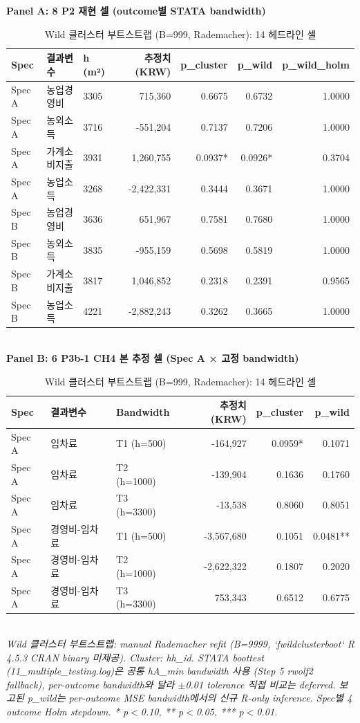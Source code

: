 \begin{table}[t]
\centering
\caption{Wild 클러스터 부트스트랩 (B=999, Rademacher): 14 헤드라인 셀}
\label{tab:wild_bootstrap_ko}
\textbf{Panel A: 8 P2 재현 셀 (outcome별 STATA bandwidth)}\\
\begin{tabular}{lllrrrr}
\toprule
Spec & 결과변수 & h (m²) & 추정치 (KRW) & p\_cluster & p\_wild & p\_wild\_holm \\
\midrule
Spec A & 농업경영비 & 3305 & 715,360 & 0.6675 & 0.6732 & 1.0000 \\
Spec A & 농외소득 & 3716 & -551,204 & 0.7137 & 0.7206 & 1.0000 \\
Spec A & 가계소비지출 & 3931 & 1,260,755 & 0.0937* & 0.0926* & 0.3704 \\
Spec A & 농업소득 & 3268 & -2,422,331 & 0.3444 & 0.3671 & 1.0000 \\
Spec B & 농업경영비 & 3636 & 651,967 & 0.7581 & 0.7680 & 1.0000 \\
Spec B & 농외소득 & 3835 & -955,159 & 0.5698 & 0.5819 & 1.0000 \\
Spec B & 가계소비지출 & 3817 & 1,046,852 & 0.2318 & 0.2391 & 0.9565 \\
Spec B & 농업소득 & 4221 & -2,882,243 & 0.3262 & 0.3665 & 1.0000 \\
\bottomrule
\end{tabular}\\[1ex]
\textbf{Panel B: 6 P3b-1 CH4 본 추정 셀 (Spec A × 고정 bandwidth)}\\
\begin{tabular}{lllrrr}
\toprule
Spec & 결과변수 & Bandwidth & 추정치 (KRW) & p\_cluster & p\_wild \\
\midrule
Spec A & 임차료 & T1 (h=500) & -164,927 & 0.0959* & 0.1071 \\
Spec A & 임차료 & T2 (h=1000) & -139,904 & 0.1636 & 0.1760 \\
Spec A & 임차료 & T3 (h=3300) & -13,538 & 0.8060 & 0.8051 \\
Spec A & 경영비-임차료 & T1 (h=500) & -3,567,680 & 0.1051 & 0.0481** \\
Spec A & 경영비-임차료 & T2 (h=1000) & -2,622,322 & 0.1807 & 0.2020 \\
Spec A & 경영비-임차료 & T3 (h=3300) & 753,343 & 0.6512 & 0.6775 \\
\bottomrule
\end{tabular}\\
\footnotesize\textit{Wild 클러스터 부트스트랩: manual Rademacher refit (B=9999, `fwildclusterboot` R 4.5.3 CRAN binary 미제공). Cluster: hh\_id. STATA boottest (11\_multiple\_testing.log)은 공통 hA\_min bandwidth 사용 (Step 5 rwolf2 fallback), per-outcome bandwidth와 달라 $\pm$0.01 tolerance 직접 비교는 deferred. 보고된 p\_wild는 per-outcome MSE bandwidth에서의 신규 R-only inference. Spec별 4 outcome Holm stepdown. * p$<$0.10, ** p$<$0.05, *** p$<$0.01.}
\end{table}

